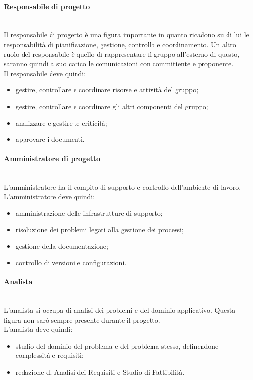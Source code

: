 			\paragraph{Responsabile di progetto} \mbox{}\\
			Il responsabile di progetto è una figura importante in quanto ricadono su di lui le responsabilità di pianificazione, gestione, controllo e coordinamento. Un altro ruolo del responsabile è quello di rappresentare il gruppo all'esterno di questo, saranno quindi a suo carico le comunicazioni con committente e proponente. \\
			Il responsabile deve quindi:
			\begin{itemize}
				\item gestire, controllare e coordinare risorse e attività del gruppo;
				\item  gestire, controllare e coordinare gli altri componenti del gruppo;
				\item analizzare e gestire le criticità;
				\item approvare i documenti.
			\end{itemize}
			\paragraph{Amministratore di progetto} \mbox{}\\
			L'amministratore ha il compito di supporto e controllo dell'ambiente di lavoro. \\
			L'amministratore deve quindi:
			\begin{itemize}
				\item amministrazione delle infrastrutture di supporto;
				\item risoluzione dei problemi legati alla gestione dei processi;
				\item gestione della documentazione;
				\item controllo di versioni e configurazioni.
			\end{itemize}
			\paragraph{Analista} \mbox{}\\
			L'analista si occupa di analisi dei problemi e del dominio applicativo. Questa figura non sarò sempre presente durante il progetto. \\
			L'analista deve quindi:
			\begin{itemize}
				\item studio del dominio del problema e del problema stesso, definendone complessità e requisiti;
				\item redazione di Analisi dei Requisiti e Studio di Fattibilità.
			\end{itemize}
